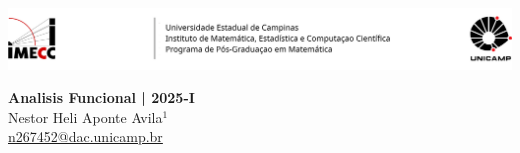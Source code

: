 \documentclass[a4paper, 11pt]{article}
\begin{document}
\- \vspace{-0.3in}
\par\noindent\includegraphics[width = \textwidth]{Imagens/Header.png}


\begin{center} %
\textbf{Analisis Funcional | 2025-I}    \\ {\small
Nestor Heli Aponte Avila\(^1\) \\ 
\href{mailto:n267452@dac.unicamp.br}{\url{n267452@dac.unicamp.br}}} %

\end{center} %


\theoremstyle{definition}
\newtheorem*{definition}{}

\theoremstyle{plain}
\newtheorem*{lemma}{{\scriptsize \(\square\)}}
\newtheorem*{proposition}{{\large \(\square\)}}
\newtheorem*{theorem}{{\large \(\blacksquare\)}}

\makeatletter
\def\@thm@headpunct{} %

\def\th@plain{%
  \thm@headpunct{} %
}

\def\th@definition{%
  \thm@headpunct{} %
}

\def\th@remark{%
  \thm@headpunct{} %
}
\makeatother
\end{document}
